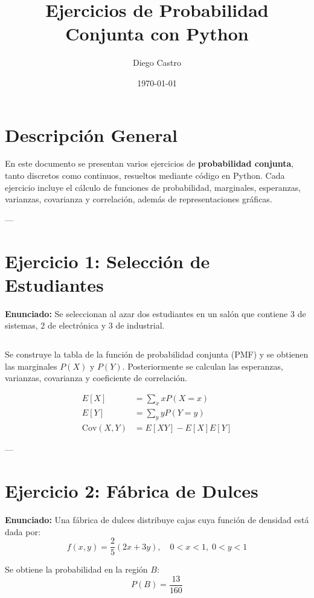\documentclass[12pt,a4paper]{article}
\title{\textbf{Ejercicios de Probabilidad Conjunta con Python}}
\author{Diego Castro}
\date{\today}
\begin{document}
\maketitle

\section*{Descripción General}
En este documento se presentan varios ejercicios de \textbf{probabilidad conjunta}, tanto discretos como continuos, resueltos mediante código en Python.  
Cada ejercicio incluye el cálculo de funciones de probabilidad, marginales, esperanzas, varianzas, covarianza y correlación, además de representaciones gráficas.

---

\section{Ejercicio 1: Selección de Estudiantes}
\textbf{Enunciado:}  
Se seleccionan al azar dos estudiantes en un salón que contiene 3 de sistemas, 2 de electrónica y 3 de industrial.  

\begin{lstlisting}[style=pythonstyle,caption={Probabilidad conjunta discreta de estudiantes seleccionados}]

\end{lstlisting}

Se construye la tabla de la función de probabilidad conjunta (PMF) y se obtienen las marginales \(P(X)\) y \(P(Y)\).  
Posteriormente se calculan las esperanzas, varianzas, covarianza y coeficiente de correlación.

\begin{align*}
E[X] &= \sum_x x P(X=x) \\
E[Y] &= \sum_y y P(Y=y) \\
\text{Cov}(X,Y) &= E[XY] - E[X]E[Y]
\end{align*}

---

\section{Ejercicio 2: Fábrica de Dulces}
\textbf{Enunciado:}  
Una fábrica de dulces distribuye cajas cuya función de densidad está dada por:
\[
f(x,y) = \frac{2}{5}(2x + 3y), \quad 0 < x < 1, \; 0 < y < 1
\]

Se obtiene la probabilidad en la región \(B\):
\[
P(B) = \frac{13}{160}
\]
\end{document}
